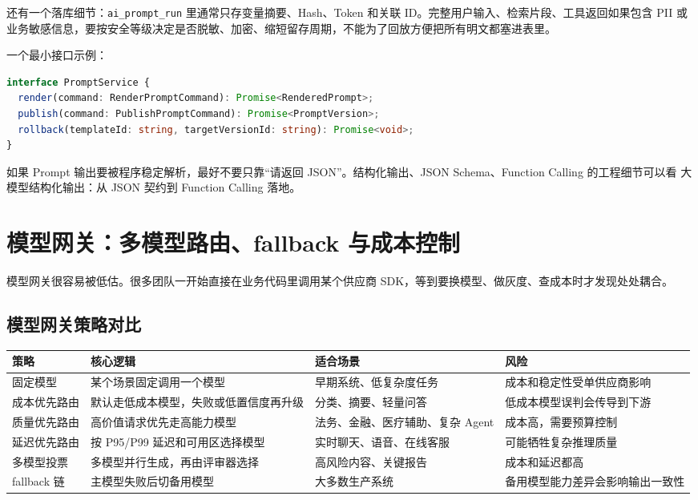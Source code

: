 \documentclass[9pt,a4paper,twocolumn]{ctexart}
\begin{document}
还有一个落库细节：\texttt{ai\_prompt\_run} 里通常只存变量摘要、Hash、Token 和关联 ID。完整用户输入、检索片段、工具返回如果包含 PII 或业务敏感信息，要按安全等级决定是否脱敏、加密、缩短留存周期，不能为了回放方便把所有明文都塞进表里。



一个最小接口示例：



\begin{lstlisting}[language=TypeScript]
interface PromptService {
  render(command: RenderPromptCommand): Promise<RenderedPrompt>;
  publish(command: PublishPromptCommand): Promise<PromptVersion>;
  rollback(templateId: string, targetVersionId: string): Promise<void>;
}
\end{lstlisting}



如果 Prompt 输出要被程序稳定解析，最好不要只靠“请返回 JSON”。结构化输出、JSON Schema、Function Calling 的工程细节可以看 大模型结构化输出：从 JSON 契约到 Function Calling 落地。



\section*{模型网关：多模型路由、fallback 与成本控制}


模型网关很容易被低估。很多团队一开始直接在业务代码里调用某个供应商 SDK，等到要换模型、做灰度、查成本时才发现处处耦合。



\subsection*{模型网关策略对比}

{\footnotesize
\begin{tabular}{|p{}|p{}|p{}|p{}|}
\hline
\textbf{策略} & \textbf{核心逻辑} & \textbf{适合场景} & \textbf{风险} \\
\hline
固定模型 & 某个场景固定调用一个模型 & 早期系统、低复杂度任务 & 成本和稳定性受单供应商影响 \\
\hline
成本优先路由 & 默认走低成本模型，失败或低置信度再升级 & 分类、摘要、轻量问答 & 低成本模型误判会传导到下游 \\
\hline
质量优先路由 & 高价值请求优先走高能力模型 & 法务、金融、医疗辅助、复杂 Agent & 成本高，需要预算控制 \\
\hline
延迟优先路由 & 按 P95/P99 延迟和可用区选择模型 & 实时聊天、语音、在线客服 & 可能牺牲复杂推理质量 \\
\hline
多模型投票 & 多模型并行生成，再由评审器选择 & 高风险内容、关键报告 & 成本和延迟都高 \\
\hline
fallback 链 & 主模型失败后切备用模型 & 大多数生产系统 & 备用模型能力差异会影响输出一致性 \\
\hline
\end{tabular}
}
\end{document}
